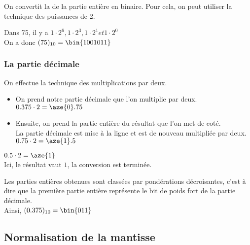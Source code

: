 On convertit la  de la partie entière en binaire. Pour cela, on peut utiliser la technique des puissances de 2.

Dans 75, il y a $ 1\cdot 2^6, 1\cdot 2^3, 1\cdot 2^1 et 1\cdot 2^0$ \\

On a donc $(75)_{10} = \bin{1001011}$



\subsubsection{La partie décimale}

On effectue la technique des multiplications par deux. \\

\begin{itemize}

	\item On prend notre partie décimale que l'on multiplie par deux. \\

$0.375 \cdot 2 = \aze{0}.75$ \\

	\item Ensuite, on prend la partie entière du résultat que l'on met de coté. \\

La partie décimale est mise à la ligne et est de nouveau multipliée par deux. \\

$0.75 \cdot 2 = \aze{1}.5$ \\


\end{itemize}

$0.5 \cdot 2 = \aze{1}$ \\

Ici, le résultat vaut $1$, la conversion est terminée. 


Les parties entières obtenues sont classées par pondérations décroisantes, c'est à dire que la première partie entière représente le bit de poids fort de la partie décimale. \\

Ainsi, $(0.375)_{10} = \bin{011}$

\subsection{Normalisation de la mantisse}

